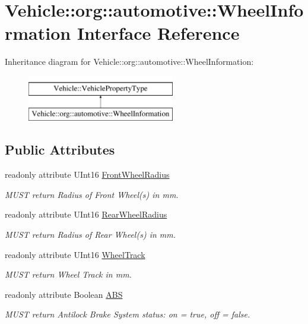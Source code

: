 \hypertarget{interfaceVehicle_1_1org_1_1automotive_1_1WheelInformation}{\section{Vehicle\-:\-:org\-:\-:automotive\-:\-:Wheel\-Information Interface Reference}
\label{interfaceVehicle_1_1org_1_1automotive_1_1WheelInformation}
}
Inheritance diagram for Vehicle\-:\-:org\-:\-:automotive\-:\-:Wheel\-Information\-:\begin{figure}[H]
\begin{center}
\leavevmode
\includegraphics[height=2.000000cm]{interfaceVehicle_1_1org_1_1automotive_1_1WheelInformation}
\end{center}
\end{figure}
\subsection*{Public Attributes}
\begin{DoxyCompactItemize}
\item 
readonly attribute U\-Int16 \hyperlink{interfaceVehicle_1_1org_1_1automotive_1_1WheelInformation_ad169af8bc66ddf49363e347256908b1e}{Front\-Wheel\-Radius}
\begin{DoxyCompactList}\small\item\em M\-U\-S\-T return Radius of Front Wheel(s) in mm. \end{DoxyCompactList}\item 
readonly attribute U\-Int16 \hyperlink{interfaceVehicle_1_1org_1_1automotive_1_1WheelInformation_acbb560b02e11b83a66b4abaa056466a1}{Rear\-Wheel\-Radius}
\begin{DoxyCompactList}\small\item\em M\-U\-S\-T return Radius of Rear Wheel(s) in mm. \end{DoxyCompactList}\item 
readonly attribute U\-Int16 \hyperlink{interfaceVehicle_1_1org_1_1automotive_1_1WheelInformation_afb7fbec6fefa9cbb13abd3766b496f64}{Wheel\-Track}
\begin{DoxyCompactList}\small\item\em M\-U\-S\-T return Wheel Track in mm. \end{DoxyCompactList}\item 
readonly attribute Boolean \hyperlink{interfaceVehicle_1_1org_1_1automotive_1_1WheelInformation_a3c7ac6fd667c722ff87406a43a06bd4f}{A\-B\-S}
\begin{DoxyCompactList}\small\item\em M\-U\-S\-T return Antilock Brake System status\-: on = true, off = false. \end{DoxyCompactList}\end{DoxyCompactItemize}


